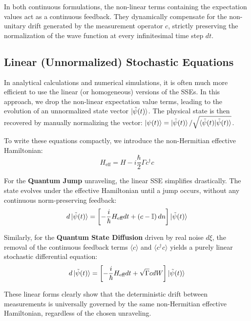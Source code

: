 \documentclass[a4paper,12pt]{article}
\begin{document}
	In both continuous formulations, the non-linear terms containing the expectation values act as a continuous feedback. They dynamically compensate for the non-unitary drift generated by the measurement operator $c$, strictly preserving the normalization of the wave function at every infinitesimal time step $dt$.
	
	\subsection{Linear (Unnormalized) Stochastic Equations}
	
	In analytical calculations and numerical simulations, it is often much more efficient to use the linear (or homogeneous) versions of the SSEs. In this approach, we drop the non-linear expectation value terms, leading to the evolution of an unnormalized state vector $\ket{\tilde{\psi}(t)}$. The physical state is then recovered by manually normalizing the vector: $\ket{\psi(t)} = \ket{\tilde{\psi}(t)} / \sqrt{\braket{\tilde{\psi}(t)|\tilde{\psi}(t)}}$.
	
	To write these equations compactly, we introduce the non-Hermitian effective Hamiltonian:
	\begin{equation}
		H_{\text{eff}} = H - i\frac{\hbar}{2} \Gamma c^\dagger c
	\end{equation}
	
	For the \textbf{Quantum Jump} unraveling, the linear SSE simplifies drastically. The state evolves under the effective Hamiltonian until a jump occurs, without any continuous norm-preserving feedback:
	\begin{equation}
		d\ket{\tilde{\psi}(t)} = \left[ -\frac{i}{\hbar} H_{\text{eff}} dt + \left( c - \mathbb{I} \right) dn \right] \ket{\tilde{\psi}(t)}
	\end{equation}
	
	Similarly, for the \textbf{Quantum State Diffusion} driven by real noise $d\xi$, the removal of the continuous feedback terms $\langle c \rangle$ and $\langle c^\dagger c \rangle$ yields a purely linear stochastic differential equation:
	\begin{equation}
		d\ket{\tilde{\psi}(t)} = \left[ -\frac{i}{\hbar} H_{\text{eff}} dt + \sqrt{\Gamma} c dW \right] \ket{\tilde{\psi}(t)}
	\end{equation}
	
	These linear forms clearly show that the deterministic drift between measurements is universally governed by the same non-Hermitian effective Hamiltonian, regardless of the chosen unraveling.
		
	\newpage
	\printbibliography
	
\end{document}
